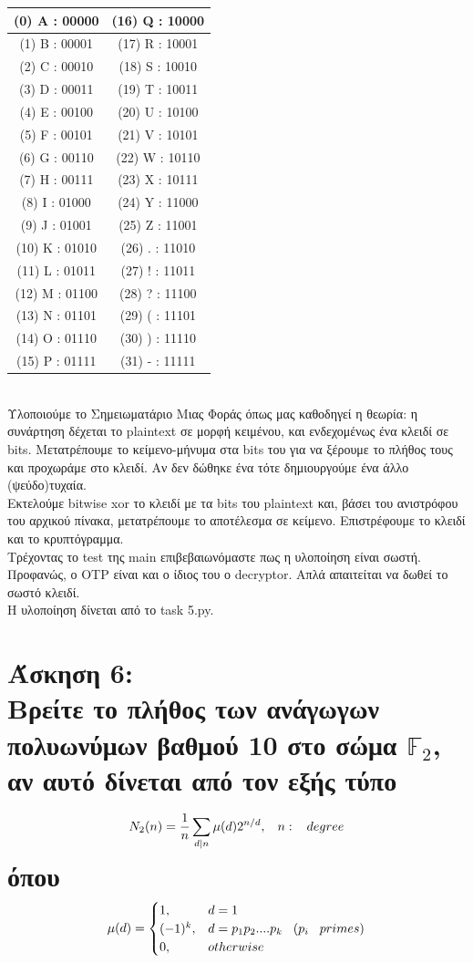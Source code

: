 \documentclass{article}
\newcommand{\blank}[1]{\hspace*{#1}}
\newcommand{\myspace}{\blank{0.3cm}}
\newcommand{\lt}[1]{\latintext #1\greektext}
\newcommand{\task}[2]{\newpage\section*{Άσκηση #1:\\#2}}
\newcommand{\myotherline}[6]{\hline (#1) #2 : #3 & (#4) #5 : #6\\}
\begin{document}
\begin{center}
    \lt{\begin{tabular}{|c||c|}
        \myotherline {0}{A}{00000}{16}{Q}{10000}
        \myotherline {1}{B}{00001}{17}{R}{10001}
        \myotherline {2}{C}{00010}{18}{S}{10010}
        \myotherline {3}{D}{00011}{19}{T}{10011}
        \myotherline {4}{E}{00100}{20}{U}{10100}
        \myotherline {5}{F}{00101}{21}{V}{10101}
        \myotherline {6}{G}{00110}{22}{W}{10110}
        \myotherline {7}{H}{00111}{23}{X}{10111}
        \myotherline {8}{I}{01000}{24}{Y}{11000}
        \myotherline {9}{J}{01001}{25}{Z}{11001}
        \myotherline{10}{K}{01010}{26}{.}{11010}
        \myotherline{11}{L}{01011}{27}{!}{11011}
        \myotherline{12}{M}{01100}{28}{?}{11100}
        \myotherline{13}{N}{01101}{29}{(}{11101}
        \myotherline{14}{O}{01110}{30}{)}{11110}
        \myotherline{15}{P}{01111}{31}{-}{11111}
        \hline
    \end{tabular}}
\end{center}

\hfill\\

Υλοποιούμε το Σημειωματάριο Μιας Φοράς όπως μας καθοδηγεί η θεωρία: η συνάρτηση δέχεται το \lt{plaintext} σε μορφή κειμένου, και ενδεχομένως ένα κλειδί σε \lt{bits}. Μετατρέπουμε το κείμενο-μήνυμα στα \lt{bits} του για να ξέρουμε το πλήθος τους και προχωράμε στο κλειδί. Αν δεν δώθηκε ένα τότε δημιουργούμε ένα άλλο (ψεύδο)τυχαία.\\

Εκτελούμε \lt{bitwise xor} το κλειδί με τα \lt{bits} του \lt{plaintext} και, βάσει του ανιστρόφου του αρχικού πίνακα, μετατρέπουμε το αποτέλεσμα σε κείμενο. Επιστρέφουμε το κλειδί και το κρυπτόγραμμα.\\

Τρέχοντας το \lt{test} της \lt{main} επιβεβαιωνόμαστε πως η υλοποίηση είναι σωστή. Προφανώς, ο \lt{OTP} είναι και ο ίδιος του ο \lt{decryptor}. Απλά απαιτείται να δωθεί το σωστό κλειδί.\\

Η υλοποίηση δίνεται από το \lt{task 5.py}.

\task{6}{
    Βρείτε το πλήθος των ανάγωγων πολυωνύμων βαθμού 10 στο σώμα $\mathbb{F}_2$, αν αυτό δίνεται από τον εξής τύπο
    \[N_2(n) = \frac{1}{n}\sum_{d|n}\mu(d)2^{n/d}, \myspace n: \myspace degree\]
    όπου
    \[
        \mu(d) = 
        \begin{cases}
            1,      &d = 1\\
            (-1)^k, &d = p_1p_2....p_k \myspace (p_i \myspace primes)\\
            0,      &otherwise
        \end{cases}
    \]
}
\end{document}
